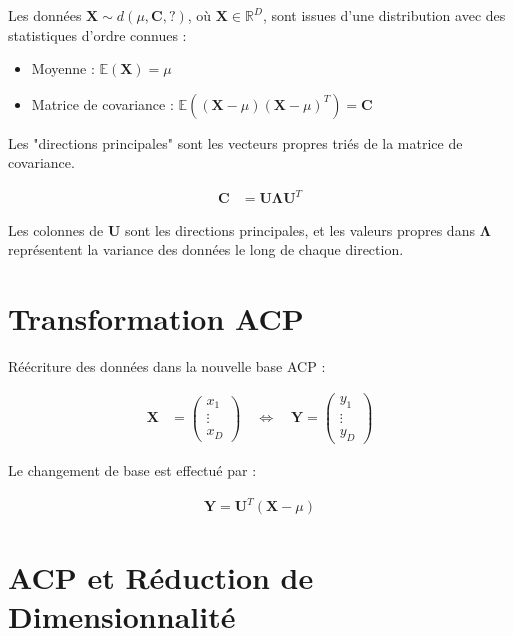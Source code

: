 \documentclass[12pt]{article}
\begin{document}
Les données \( \mathbf{X} \sim d(\mu, \mathbf{C}, ?) \), où \( \mathbf{X} \in \mathbb{R}^D \), sont issues d'une distribution avec des statistiques d'ordre connues :

\begin{itemize}
\item Moyenne : \( \mathbb{E}(\mathbf{X}) = \mu \)
\item Matrice de covariance : \( \mathbb{E}((\mathbf{X} - \mu)(\mathbf{X} - \mu)^T) = \mathbf{C} \)
\end{itemize}

Les "directions principales" sont les vecteurs propres triés de la matrice de covariance.

\begin{align}
\mathbf{C} &= \mathbf{U} \mathbf{\Lambda} \mathbf{U}^T
\end{align}

\begin{tcolorbox}[title={À retenir}]
Les colonnes de \(\mathbf{U}\) sont les directions principales, et les valeurs propres dans \(\mathbf{\Lambda}\) représentent la variance des données le long de chaque direction.
\end{tcolorbox}

\newpage

\section{Transformation ACP}

Réécriture des données dans la nouvelle base ACP :

\begin{align}
\mathbf{X} &= \begin{pmatrix} x_1 \\ \vdots \\ x_D \end{pmatrix} \quad \Longleftrightarrow \quad \mathbf{Y} = \begin{pmatrix} y_1 \\ \vdots \\ y_D \end{pmatrix}
\end{align}

Le changement de base est effectué par :

\begin{align}
\mathbf{Y} = \mathbf{U}^T (\mathbf{X} - \mu)
\end{align}

\newpage

\section{ACP et Réduction de Dimensionnalité}
\end{document}
